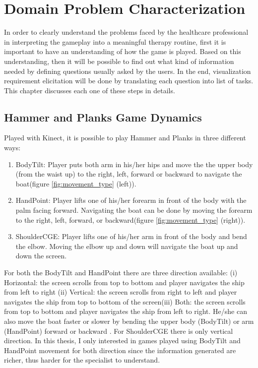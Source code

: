 \chapter{Domain Problem Characterization}
\label{chap:problem}

In order to clearly understand the problems faced by the healthcare professional in interpreting the gameplay into a meaningful therapy routine, first it is important to have an understanding of how the game is played. Based on this understanding, then it will be possible to find out what kind of information needed by defining questions usually asked by the users. In the end, visualization requirement elicitation will be done by translating each question into list of tasks. This chapter discusses each one of these steps in details.

\section{Hammer and Planks Game Dynamics}

Played with Kinect, it is possible to play Hammer and Planks in three different ways:
\begin{enumerate}
  \item BodyTilt:
  Player puts both arm in his/her hips and move the the upper body (from the waist up) to the right, left, forward or backward to navigate the boat(figure \ref{fig:movement_type} (left)). 
  \item HandPoint:
  Player lifts one of his/her forearm in front of the body with the palm facing forward. Navigating the boat can be done by moving the forearm to the right, left, forward, or backward(figure \ref{fig:movement_type} (right)).
  \item ShoulderCGE:
  Player lifts one of his/her arm in front of the body and bend the elbow. Moving the elbow up and down will navigate the boat up and down the screen.
\end{enumerate}

For both the BodyTilt and HandPoint there are three direction available: (i) Horizontal: the screen scrolls from top to bottom and player navigates the ship from left to right (ii) Vertical: the screen scrolls from right to left and player navigates the ship from top to bottom of the screen(iii) Both: the screen scrolls from top to bottom and player navigates the ship from left to right. He/she can also move the boat faster or slower by bending the upper body (BodyTilt) or arm (HandPoint) forward or backward . For ShoulderCGE there is only vertical direction. In this thesis, I only interested in games played using BodyTilt and HandPoint movement for both direction since the information generated are richer, thus harder for the specialist to understand.

